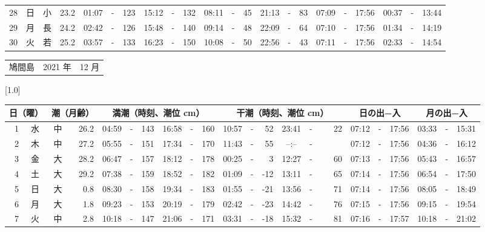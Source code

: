 \documentclass[12pt,a4j]{jsarticle}
\begin{document}
\begin{table}[htbp]
\begin{center}
{\begin{tabular}{|rc|cr|ccrccr|ccrccr|ccc|ccc|}
28 & 日 & 小 & 23.2 &  01:07 &-& 123 &  15:12 &-& 132 &  08:11 &-&  45 &  21:13 &-&  83 & 07:09 & -& 17:56 & 00:37 & -& 13:44 \\
29 & 月 & 長 & 24.2 &  02:42 &-& 126 &  15:48 &-& 140 &  09:14 &-&  48 &  22:09 &-&  64 & 07:10 & -& 17:56 & 01:34 & -& 14:19 \\
30 & 火 & 若 & 25.2 &  03:57 &-& 133 &  16:23 &-& 150 &  10:08 &-&  50 &  22:56 &-&  43 & 07:11 & -& 17:56 & 02:33 & -& 14:54 \\
   \hline
   \end{tabular}}
   \end{center}
\end{table}
\newpage
 \begin{table}[htbp]
 \begin{center}
 \begin{tabular}{lcc}
 \LARGE{鳩間島}  & \large{2021 年} & \large{12 月} \\
 \end{tabular}
 \end{center}
 \begin{center}
    \scalebox{0.7}[1.0]{
    \begin{tabular}{|rc|cr|ccrccr|ccrccr|ccc|ccc|}
    \hline
    \multicolumn{2}{|c|}{日（曜）} & \multicolumn{2}{c|}{潮（月齢）} & \multicolumn{6}{c|}{満潮（時刻、潮位 cm）} & \multicolumn{6}{c|}{干潮（時刻、潮位 cm）} & \multicolumn{3}{c|}{日の出−入} &  \multicolumn{3}{c|}{月の出−入}\\
 \hline
 1 & 水 & 中 & 26.2 &  04:59 &-& 143 &  16:58 &-& 160 &  10:57 &-&  52 &  23:41 &-&  22 & 07:12 & -& 17:56 & 03:33 & -& 15:31 \\
 2 & 木 & 中 & 27.2 &  05:55 &-& 151 &  17:34 &-& 170 &  11:43 &-&  55 &  --:-- &-&~~~~~ & 07:12 & -& 17:56 & 04:36 & -& 16:12 \\
 3 & 金 & 大 & 28.2 &  06:47 &-& 157 &  18:12 &-& 178 &  00:25 &-&   3 &  12:27 &-&  60 & 07:13 & -& 17:56 & 05:43 & -& 16:57 \\
 4 & 土 & 大 & 29.2 &  07:38 &-& 159 &  18:52 &-& 182 &  01:09 &-& -12 &  13:11 &-&  65 & 07:14 & -& 17:56 & 06:54 & -& 17:50 \\
 5 & 日 & 大 &  0.8 &  08:30 &-& 158 &  19:34 &-& 183 &  01:55 &-& -21 &  13:56 &-&  71 & 07:14 & -& 17:56 & 08:05 & -& 18:49 \\
 6 & 月 & 大 &  1.8 &  09:23 &-& 153 &  20:19 &-& 179 &  02:42 &-& -23 &  14:42 &-&  76 & 07:15 & -& 17:56 & 09:15 & -& 19:54 \\
 7 & 火 & 中 &  2.8 &  10:18 &-& 147 &  21:06 &-& 171 &  03:31 &-& -18 &  15:32 &-&  81 & 07:16 & -& 17:57 & 10:18 & -& 21:02 \\

\end{tabular}}
\end{center}
\end{table}
\end{document}
